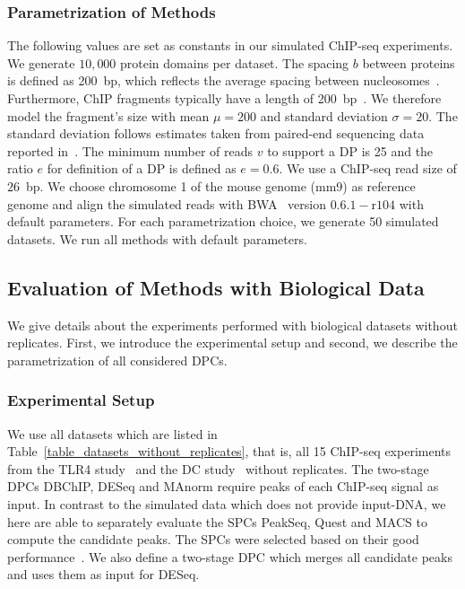 \subsubsection{Parametrization of Methods}
The following values are set as constants in our simulated ChIP-seq experiments. 
We generate $10,000$ protein domains per dataset.
The spacing $b$ between proteins is defined as 200~bp, which reflects the average spacing between nucleosomes~\citep{mammana2013}. 
Furthermore, ChIP fragments typically have a length of 200~bp~\citep{Furey2012}.
We therefore model the fragment's size with mean $\mu=200$ and standard deviation $\sigma=20$. 
The standard deviation follows estimates taken from paired-end sequencing data reported in~\citep{Marschall2012}.
The minimum number of reads $v$ to support a DP is 25 and the ratio $e$ for definition of a DP is defined as $e=0.6$.
We use a ChIP-seq read size of $26$~bp.
We choose chromosome 1 of the mouse genome (mm9) as reference genome and align the simulated reads with BWA~\citep{li2010} version $0.6.1-\text{r}104$ with default parameters.
For each parametrization choice, we generate 50 simulated datasets.
We run all methods with default parameters.

\subsection{Evaluation of Methods with Biological Data}
We give details about the experiments performed with biological datasets without replicates.
First, we introduce the experimental setup and second, we describe the parametrization of all considered DPCs.

\subsubsection{Experimental Setup}
We use all datasets which are listed in Table~\ref{table_datasets_without_replicates}, that is, all 15 ChIP-seq experiments from the TLR4 study~\citep{kaikonnen2013} and the DC study~\citep{Lin2015} without replicates.
The two-stage DPCs DBChIP, DESeq and MAnorm require peaks of each ChIP-seq signal as input.
In contrast to the simulated data which does not provide input-DNA, we here are able to separately evaluate the SPCs PeakSeq, Quest and MACS to compute the candidate peaks.
The SPCs were selected based on their good performance~\citep{Chen2012, wilbanks2010}.
We also define a two-stage DPC which merges all candidate peaks and uses them as input for DESeq. 

